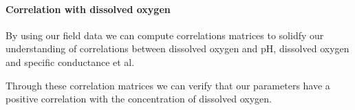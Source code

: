 \paragraph{Correlation with dissolved oxygen}
By using our field data we can compute correlations matrices to solidfy our understanding of correlations between dissolved oxygen and pH, dissolved oxygen and specific conductance et al.

Through these correlation matrices we can verify that our parameters have a positive correlation with the concentration of dissolved oxygen.

\begin{figure}[H]
    \quad

\end{figure}
